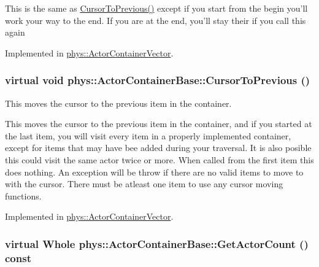 This is the same as \hyperlink{classphys_1_1ActorContainerBase_a7c424168c0bbd973b283a083714123b3}{CursorToPrevious()} except if you start from the begin you'll work your way to the end. If you are at the end, you'll stay their if you call this again 

Implemented in \hyperlink{classphys_1_1ActorContainerVector_a1c72366a6261d8e98dc0a9d2fad9f70f}{phys::ActorContainerVector}.

\hypertarget{classphys_1_1ActorContainerBase_a7c424168c0bbd973b283a083714123b3}{
\subsubsection[{CursorToPrevious}]{\setlength{\rightskip}{0pt plus 5cm}virtual void phys::ActorContainerBase::CursorToPrevious ()}}
\label{d1/d00/classphys_1_1ActorContainerBase_a7c424168c0bbd973b283a083714123b3}


This moves the cursor to the previous item in the container. 

This moves the cursor to the previous item in the container, and if you started at the last item, you will visit every item in a properly implemented container, except for items that may have bee added during your traversal. It is also posible this could visit the same actor twice or more. When called from the first item this does nothing. An exception will be throw if there are no valid items to move to with the cursor. There must be atleast one item to use any cursor moving functions. 

Implemented in \hyperlink{classphys_1_1ActorContainerVector_ac483bcdf348f55dc8b04a8805a002413}{phys::ActorContainerVector}.

\hypertarget{classphys_1_1ActorContainerBase_aa5ec651d4634b2d90efe2a76f9d2fbdd}{
\subsubsection[{GetActorCount}]{\setlength{\rightskip}{0pt plus 5cm}virtual {\bf Whole} phys::ActorContainerBase::GetActorCount () const}}
\label{d1/d00/classphys_1_1ActorContainerBase_aa5ec651d4634b2d90efe2a76f9d2fbdd}


